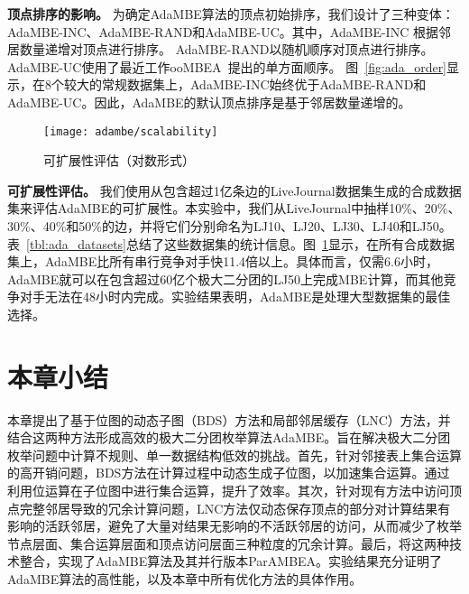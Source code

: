 \textbf{顶点排序的影响。} 为确定AdaMBE算法的顶点初始排序，我们设计了三种变体：AdaMBE-INC、AdaMBE-RAND和AdaMBE-UC。其中，AdaMBE-INC 根据邻居数量递增对顶点进行排序。 AdaMBE-RAND以随机顺序对顶点进行排序。 AdaMBE-UC使用了最近工作ooMBEA~\cite{ooMBE22}提出的单方面顺序。 图~\ref{fig:ada_order}显示，在8个较大的常规数据集上，AdaMBE-INC始终优于AdaMBE-RAND和AdaMBE-UC。因此，AdaMBE的默认顶点排序是基于邻居数量递增的。


\begin{figure} [H]
	\centering
		\texttt{[image: adambe/scalability]}
	\caption{可扩展性评估（对数形式）}
	\label{fig:ada_scalability}
\end{figure}


\textbf{可扩展性评估。} 我们使用从包含超过1亿条边的LiveJournal数据集生成的合成数据集来评估AdaMBE的可扩展性。本实验中，我们从LiveJournal中抽样10\%、20\%、30\%、40\%和50\%的边，并将它们分别命名为LJ10、LJ20、LJ30、LJ40和LJ50。表~\ref{tbl:ada_datasets}总结了这些数据集的统计信息。图~\ref{fig:ada_scalability}显示，在所有合成数据集上，AdaMBE比所有串行竞争对手快11.4倍以上。具体而言，仅需6.6小时，AdaMBE就可以在包含超过60亿个极大二分团的LJ50上完成MBE计算，而其他竞争对手无法在48小时内完成。实验结果表明，AdaMBE是处理大型数据集的最佳选择。

\section{本章小结}

本章提出了基于位图的动态子图（BDS）方法和局部邻居缓存（LNC）方法，并结合这两种方法形成高效的极大二分团枚举算法AdaMBE。旨在解决极大二分团枚举问题中计算不规则、单一数据结构低效的挑战。首先，针对邻接表上集合运算的高开销问题，BDS方法在计算过程中动态生成子位图，以加速集合运算。通过利用位运算在子位图中进行集合运算，提升了效率。其次，针对现有方法中访问顶点完整邻居导致的冗余计算问题，LNC方法仅动态保存顶点的部分对计算结果有影响的活跃邻居，避免了大量对结果无影响的不活跃邻居的访问，从而减少了枚举节点层面、集合运算层面和顶点访问层面三种粒度的冗余计算。最后，将这两种技术整合，实现了AdaMBE算法及其并行版本ParAMBEA。实验结果充分证明了AdaMBE算法的高性能，以及本章中所有优化方法的具体作用。